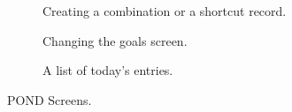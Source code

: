 \begin{figure}	
\centering
	\begin{subfigure}[t]{1.25in}
		\centering
		\setlength\fboxsep{0pt}
\setlength\fboxrule{0.5pt}
		\caption{Creating a combination or a shortcut record.}\label{fig:pond_combo}
	\end{subfigure}
\quad
\begin{subfigure}[t]{1.25in}
		\centering
		\setlength\fboxsep{0pt}
\setlength\fboxrule{0.5pt}
		\caption{Changing the goals screen.  }\label{fig:pond_goals}
	\end{subfigure}
\quad
\begin{subfigure}[t]{1.25in}
		\centering
		\setlength\fboxsep{0pt}
\setlength\fboxrule{0.5pt}
		\caption{A list of today's entries. }\label{fig:pond_details_c}
	\end{subfigure}
	\caption{POND Screens.}\label{fig:pond_details}
\end{figure}

